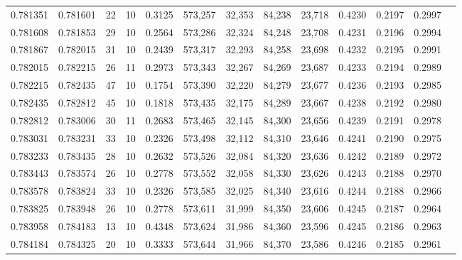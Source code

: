 \begin{tabular}{rrrrrrrrrrrrr}
0.781351 & 0.781601 &    22 &  10 &                                     0.3125 & 573,257 &  32,353 &  84,238 &  23,718 & 0.4230 & 0.2197 & 0.2997 \\
0.781608 & 0.781853 &    29 &  10 &                                     0.2564 & 573,286 &  32,324 &  84,248 &  23,708 & 0.4231 & 0.2196 & 0.2994 \\
0.781867 & 0.782015 &    31 &  10 &                                     0.2439 & 573,317 &  32,293 &  84,258 &  23,698 & 0.4232 & 0.2195 & 0.2991 \\
0.782015 & 0.782215 &    26 &  11 &                                     0.2973 & 573,343 &  32,267 &  84,269 &  23,687 & 0.4233 & 0.2194 & 0.2989 \\
0.782215 & 0.782435 &    47 &  10 &                                     0.1754 & 573,390 &  32,220 &  84,279 &  23,677 & 0.4236 & 0.2193 & 0.2985 \\
0.782435 & 0.782812 &    45 &  10 &                                     0.1818 & 573,435 &  32,175 &  84,289 &  23,667 & 0.4238 & 0.2192 & 0.2980 \\
0.782812 & 0.783006 &    30 &  11 &                                     0.2683 & 573,465 &  32,145 &  84,300 &  23,656 & 0.4239 & 0.2191 & 0.2978 \\
0.783031 & 0.783231 &    33 &  10 &                                     0.2326 & 573,498 &  32,112 &  84,310 &  23,646 & 0.4241 & 0.2190 & 0.2975 \\
0.783233 & 0.783435 &    28 &  10 &                                     0.2632 & 573,526 &  32,084 &  84,320 &  23,636 & 0.4242 & 0.2189 & 0.2972 \\
0.783443 & 0.783574 &    26 &  10 &                                     0.2778 & 573,552 &  32,058 &  84,330 &  23,626 & 0.4243 & 0.2188 & 0.2970 \\
0.783578 & 0.783824 &    33 &  10 &                                     0.2326 & 573,585 &  32,025 &  84,340 &  23,616 & 0.4244 & 0.2188 & 0.2966 \\
0.783825 & 0.783948 &    26 &  10 &                                     0.2778 & 573,611 &  31,999 &  84,350 &  23,606 & 0.4245 & 0.2187 & 0.2964 \\
0.783958 & 0.784183 &    13 &  10 &                                     0.4348 & 573,624 &  31,986 &  84,360 &  23,596 & 0.4245 & 0.2186 & 0.2963 \\
0.784184 & 0.784325 &    20 &  10 &                                     0.3333 & 573,644 &  31,966 &  84,370 &  23,586 & 0.4246 & 0.2185 & 0.2961 \\

\end{tabular}
